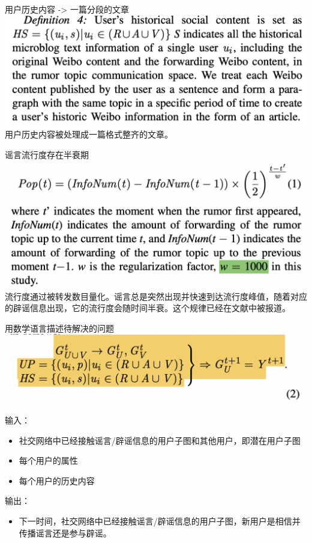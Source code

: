 \documentclass{beamer}
\begin{document}
\begin{frame}{用户历史内容 -> 一篇分段的文章}
	\includegraphics[width=\linewidth]{Assets/定义4.png}
	用户历史内容被处理成一篇格式整齐的文章。
\end{frame}

\begin{frame}{谣言流行度存在半衰期}
	\includegraphics[width=\linewidth]{Assets/定义5.png}
	流行度通过被转发数目量化。谣言总是突然出现并快速到达流行度峰值，随着对应的辟谣信息出现，它的流行度会随时间半衰。这个规律已经在文献中被报道。
\end{frame}

\begin{frame}{用数学语言描述待解决的问题}
	\includegraphics[width=\linewidth]{Assets/公式2.png}
	输入：
	\begin{itemize}
		\item 社交网络中已经接触谣言/辟谣信息的用户子图和其他用户，即潜在用户子图
		\item 每个用户的属性
		\item 每个用户的历史内容
	\end{itemize}
	输出：
	\begin{itemize}
		\item 下一时间，社交网络中已经接触谣言/辟谣信息的用户子图，新用户是相信并传播谣言还是参与辟谣。
	\end{itemize}
\end{frame}
\end{document}
